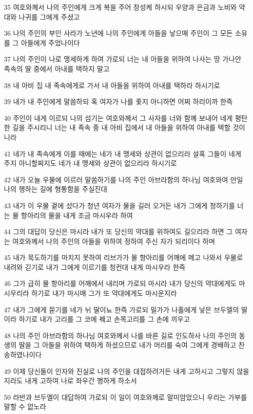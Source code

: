 \par 35 여호와께서 나의 주인에게 크게 복을 주어 창성케 하시되 우양과 은금과 노비와 약대와 나귀를 그에게 주셨고
\par 36 나의 주인의 부인 사라가 노년에 나의 주인에게 아들을 낳으매 주인이 그 모든 소유를 그 아들에게 주었나이다
\par 37 나의 주인이 나로 맹세하게 하여 가로되 너는 내 아들을 위하여 나사는 땅 가나안 족속의 딸 중에서 아내를 택하지 말고
\par 38 내 아비 집 내 족속에게로 가서 내 아들을 위하여 아내를 택하라 하시기로
\par 39 내가 내 주인에게 말씀하되 혹 여자가 나를 좇지 아니하면 어찌 하리이까 한즉
\par 40 주인이 내게 이르되 나의 섬기는 여호와께서 그 사자를 너와 함께 보내어 네게 평탄한 길을 주시리니 너는 내 족속 중 내 아비 집에서 내 아들을 위하여 아내를 택할 것이니라
\par 41 네가 내 족속에게 이를 때에는 네가 내 맹세와 상관이 없으리라 설혹 그들이 네게 주지 아니할찌지도 네가 내 맹세와 상관이 없으리라 하시기로
\par 42 내가 오늘 우물에 이르러 말씀하기를 나의 주인 아브라함의 하나님 여호와여 만일 나의 행하는 길에 형통함을 주실진대
\par 43 내가 이 우물 곁에 섰다가 청년 여자가 물을 길러 오거든 내가 그에게 청하기를 너는 물 항아리의 물을 내게 조금 마시우라 하여
\par 44 그의 대답이 당신은 마시라 내가 또 당신의 약대를 위하여도 길으리라 하면 그 여자는 여호와께서 나의 주인의 아들을 위하여 정하여 주신 자가 되리이다 하며
\par 45 내가 묵도하기를 마치지 못하여 리브가가 물 항아리를 어깨에 메고 나와서 우물로 내려와 긷기로 내가 그에게 이르기를 청컨대 내게 마시우라 한즉
\par 46 그가 급히 물 항아리를 어깨에서 내리며 가로되 마시라 내가 당신의 약대에게도 마시우리라 하기로 내가 마시매 그가 또 약대에게도 마시운지라
\par 47 내가 그에게 묻기를 네가 뉘 딸이뇨 한즉 가로되 밀가가 나홀에게 낳은 브두엘의 딸이라 하기로 내가 고리를 그 코에 꿰고 손목고리를 그 손에 끼우고
\par 48 나의 주인 아브라함의 하나님 여호와께서 나를 바른 길로 인도하사 나의 주인의 동생의 딸을 그 아들을 위하여 택하게 하셨으므로 내가 머리를 숙여 그에게 경배하고 찬송하였나이다
\par 49 이제 당신들이 인자와 진실로 나의 주인을 대접하려거든 내게 고하시고 그렇지 않을지라도 내게 고하여 나로 좌우간 행하게 하소서
\par 50 라반과 브두엘이 대답하여 가로되 이 일이 여호와께로 말미암았으니 우리는 가부를 말할 수 없노라
